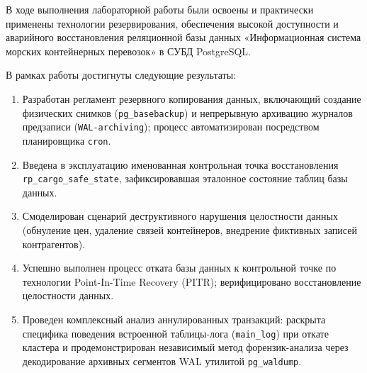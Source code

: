\documentclass[a4paper,14pt]{article}
\begin{document}
В ходе выполнения лабораторной работы были освоены и практически применены технологии резервирования, обеспечения высокой доступности и аварийного восстановления реляционной базы данных «Информационная система морских контейнерных перевозок» в СУБД PostgreSQL.

В рамках работы достигнуты следующие результаты:
\begin{enumerate}
    \item Разработан регламент резервного копирования данных, включающий создание физических снимков (\texttt{pg\_basebackup}) и непрерывную архивацию журналов предзаписи (\texttt{WAL-archiving}); процесс автоматизирован посредством планировщика \texttt{cron}.
    \item Введена в эксплуатацию именованная контрольная точка восстановления \texttt{rp\_cargo\_safe\_state}, зафиксировавшая эталонное состояние таблиц базы данных.
    \item Смоделирован сценарий деструктивного нарушения целостности данных (обнуление цен, удаление связей контейнеров, внедрение фиктивных записей контрагентов).
    \item Успешно выполнен процесс отката базы данных к контрольной точке по технологии Point-In-Time Recovery (PITR); верифицировано восстановление целостности данных.
    \item Проведен комплексный анализ аннулированных транзакций: раскрыта специфика поведения встроенной таблицы-лога (\texttt{main\_log}) при откате кластера и продемонстрирован независимый метод форензик-анализа через декодирование архивных сегментов WAL утилитой \texttt{pg\_waldump}.
\end{enumerate}
\end{document}
